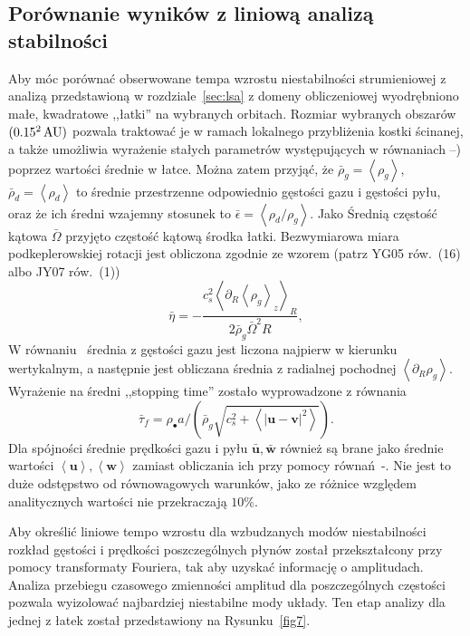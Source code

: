 \subsection{Porównanie wyników z liniową analizą stabilności}
Aby móc porównać obserwowane tempa wzrostu niestabilności strumieniowej z
analizą przedstawioną w rozdziale~\ref{sec:lsa} z domeny obliczeniowej
wyodrębniono małe, kwadratowe ,,łatki'' na wybranych orbitach. Rozmiar wybranych
obszarów $(0.15^2\hbox{$\thinspace\textrm{AU}$})$ pozwala traktować je w ramach lokalnego przybliżenia
kostki ścinanej, a także umożliwia wyrażenie stałych parametrów występujących w
równaniach --) poprzez wartości średnie w łatce.
Można zatem przyjąć, że $\bar{\rho}_g = \left<\rho_g\right>$, $\bar{\rho}_d =
\left<\rho_d\right>$ to średnie przestrzenne odpowiednio gęstości gazu i
gęstości pyłu, oraz że ich średni wzajemny stosunek to $\bar{\epsilon} =
\left<\rho_d / \rho_g\right>$. Jako Średnią częstość kątowa $\bar{\Omega}$
przyjęto częstość kątową środka łatki. Bezwymiarowa miara podkeplerowskiej
rotacji jest obliczona zgodnie ze wzorem (patrz YG05 rów.~(16) albo JY07
rów.~(1))
%
\begin{equation}
   \bar{\eta} = -\frac{c_s^2\left<\partial_R \left<\rho_g\right>_z\right>_R}
      {2\bar{\rho}_g\bar{\Omega}^2 R},
   \label{eq:eta}
\end{equation}
%
W równaniu~ średnia z gęstości gazu jest liczona najpierw w
kierunku wertykalnym, a następnie jest obliczana średnia z radialnej pochodnej 
$\left<\partial_R \rho_g\right>$. Wyrażenie na średni ,,stopping time'' zostało
wyprowadzone z równania~
\begin{equation}
   \bar{\tau}_f = \rho_\bullet a / \left(\bar{\rho}_g \sqrt{c_s^2 +
   \left<\left|\mathbf{u} - \mathbf{v}\right|^2\right>} \right).
\end{equation}
%
Dla spójności średnie prędkości gazu i pyłu $\bar{\mathbf{u}},
\bar{\mathbf{w}}$ również są brane jako średnie wartości
$\left<\mathbf{u}\right>, \left<\mathbf{w}\right>$ zamiast obliczania ich przy
pomocy równań~-. Nie jest to duże odstępstwo od
równowagowych warunków, jako ze różnice względem analitycznych wartości nie
przekraczają $10\%$.
\par Aby określić liniowe tempo wzrostu dla wzbudzanych modów niestabilności
rozkład gęstości i prędkości poszczególnych płynów został przekształcony przy
pomocy transformaty Fouriera, tak aby uzyskać informację o amplitudach. Analiza
przebiegu czasowego zmienności amplitud dla poszczególnych częstości pozwala
wyizolować najbardziej niestabilne mody układy. Ten etap analizy dla jednej z
łatek został przedstawiony na Rysunku~\ref{fig7}.

